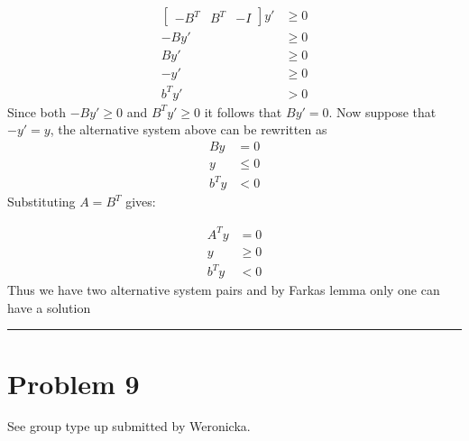 \documentclass{article} %
\begin{document}
\begin{enumerate}
\begin{equation*}
\begin{aligned}
\begin{bmatrix} -B^T  & B^T & -I\end{bmatrix} y' & \geq 0  \\ 
-B y' &\geq 0  \\ 
B y' &\geq 0  \\ 
-y' &\geq 0 \\
b^T y' & >  0
\end{aligned}
\end{equation*}
Since both $-B y' \geq 0$ and $B^T y' \geq 0$ it follows that $B y' = 0$. Now suppose that $-y' = y$, the alternative system above can be rewritten as 
\begin{equation*}
\begin{aligned}
By &= 0 \\ 
y &\leq 0 \\ 
b^T y &< 0 
\end{aligned}
\end{equation*}
Substituting $A = B^T$ gives:

\begin{equation*}
\begin{aligned}
A^Ty &= 0 \\ 
y &\geq 0 \\ 
b^T y &< 0 
\end{aligned}
\end{equation*}
Thus we have two alternative system pairs and by Farkas lemma only one can have a solution
\rule{\textwidth}{1pt}
\end{enumerate}

\section*{Problem 9}
See group type up submitted by Weronicka. 
\end{document}
